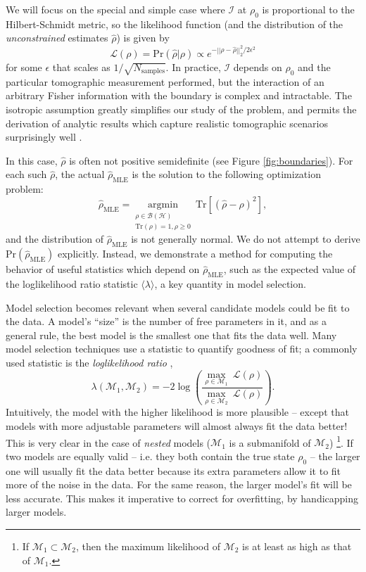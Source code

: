 \documentclass[aps,pra, twocolumn]{revtex4}
\newcommand{\M}{\mathcal{M}}
\newcommand{\cH}{\mathcal{H}}
\newcommand{\cL}{\mathcal{L}}
\newcommand{\Fi}{\mathcal{I}}
\newcommand{\rhohat}{\hat{\rho}}
\newcommand{\rhoMLE}{\rhohat_{\scriptscriptstyle\mathrm{MLE}}}
\begin{document}
We will focus on the special and simple case where $\Fi$ at $\rho_{0}$ is  proportional to the Hilbert-Schmidt metric, so the likelihood function (and the distribution of the \emph{unconstrained} estimates $\rhohat$) is given by 
\begin{equation}
\label{eq:likelihood}
\cL(\rho) = \mathrm{Pr}(\rhohat | \rho) \propto e^{-||\rho - \rhohat||^{2}_{2}/2\epsilon^{2}}
\end{equation}
for some $\epsilon$ that scales as $1 / \sqrt{N_{\mathrm{samples}}}$.  In practice, $\Fi$  depends  on $\rho_{0}$ and the particular tomographic measurement performed, but the interaction of an arbitrary Fisher information with the boundary is complex and intractable. The isotropic assumption greatly simplifies our study of the problem, and permits the derivation of analytic results which capture realistic tomographic scenarios surprisingly well \cite{Smolin2012}.

In this case, $\rhohat$ is often not positive semidefinite (see Figure \ref{fig:boundaries}). For each such $\rhohat$, the actual $\rhoMLE$ is the solution to the following optimization problem:
\begin{equation}
\label{eq:mleopt}
\rhoMLE = \underset{\substack{\rho \in \mathcal{B}(\cH)  \\ \mathrm{Tr}(\rho)=1, \rho \geq 0}}{\mathrm{argmin}}~\mathrm{Tr}[(\rhohat - \rho)^{2}],
\end{equation}
and the distribution of $\rhoMLE$ is not generally normal. We do not attempt to derive $\mathrm{Pr}(\rhoMLE)$ explicitly. Instead, we demonstrate a method for computing the behavior of useful statistics which depend on $\rhoMLE$, such as the expected value of the loglikelihood ratio statistic $\langle \lambda \rangle$, a key quantity in model selection.

Model selection becomes relevant when several candidate models could be fit to the data.  A model's ``size'' is the number of free parameters in it, and as a general rule, the best model is the smallest one that fits the data well.  Many model selection techniques use a statistic to quantify goodness of fit; a commonly used statistic is the \emph{loglikelihood ratio} \cite{Blume-Kohout2010, Moroder2013, Neyman1933},
\begin{equation}
\lambda(\M_{1}, \M_{2}) = -2 \log \left(\frac{\underset{\rho \in \M_{1}}{\max}~\cL(\rho)}{\underset{\rho \in 
\M_{2}}{\max}~\cL(\rho)}\right).
\end{equation}
Intuitively, the model with the higher likelihood is more plausible -- except that models with 
more adjustable parameters will almost always fit the data better!  This is very clear in the case
of \emph{nested} models ($\M_{1}$ is a submanifold of $\M_{2}$) \footnote{If $\M_{1}\subset \M_{2}$, then the maximum likelihood of $\M_{2}$ is at least as high as that of $\M_{1}$.}. If two models are equally valid -- i.e. they both contain the true state $\rho_0$ -- the larger one will usually fit the data better because its extra parameters allow it to fit more of the noise in the data.  For the same reason, the larger model's fit will be less accurate.  This makes it imperative to correct for overfitting, by handicapping larger models.
\end{document}
